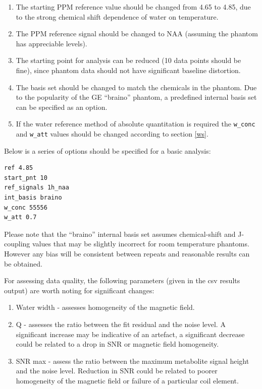 \documentclass[a4paper,12pt]{article}
\begin{document}
\begin{enumerate}
\item The starting PPM reference value should be changed from 4.65 to 4.85, due to the strong chemical shift dependence of water on temperature.
\item The PPM reference signal should be changed to NAA (assuming the phantom has appreciable levels).
\item The starting point for analysis can be reduced (10 data points should be fine), since phantom data should not have significant baseline distortion.
\item The basis set should be changed to match the chemicals in the phantom. Due to the popularity of the GE ``braino'' phantom, a predefined internal basis set can be specified as an option.
\item If the water reference method of absolute quantitation is required the \texttt{w\_conc} and \texttt{w\_att} values should be changed according to section \ref{ws}.
\end{enumerate}

Below is a series of options should be specified for a basic analysis:

\noindent\hrulefill
\begin{verbatim}
ref 4.85
start_pnt 10
ref_signals 1h_naa
int_basis braino
w_conc 55556
w_att 0.7
\end{verbatim}
\noindent\hrulefill

Please note that the ``braino'' internal basis set assumes chemical-shift and J-coupling values that may be slightly incorrect for room temperature phantoms. However any bias will be consistent between repeats and reasonable results can be obtained.

For assessing data quality, the following parameters (given in the csv results output) are worth noting for significant changes:
\begin{enumerate}
\item Water width - assesses homogeneity of the magnetic field.
\item Q - assesses the ratio between the fit residual and the noise level. A significant increase may be indicative of an artefact, a significant decrease could be related to a drop in SNR or magnetic field homogeneity.
\item SNR max - assess the ratio between the maximum metabolite signal height and the noise level. Reduction in SNR could be related to poorer homogeneity of the magnetic field or failure of a particular coil element.
\end{enumerate}
\end{document}
